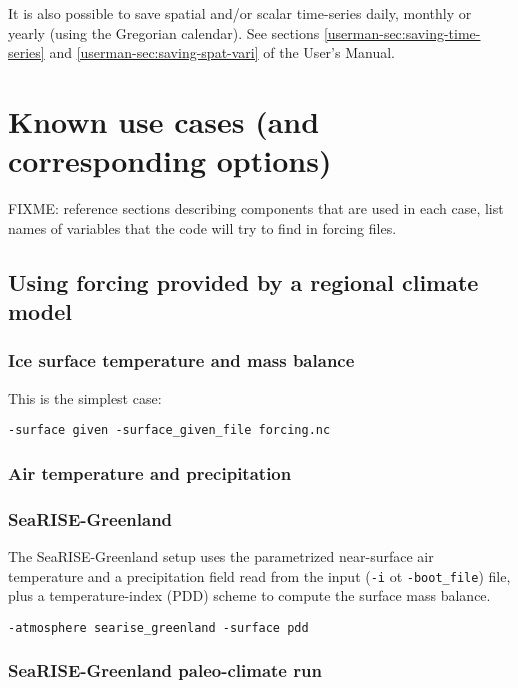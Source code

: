 \documentclass[titlepage,letterpaper,final]{scrartcl}
\begin{document}
It is also possible to save spatial and/or scalar time-series daily, monthly or
yearly (using the Gregorian calendar). See sections \ref*{userman-sec:saving-time-series}
and \ref*{userman-sec:saving-spat-vari} of the User's Manual.

\section{Known use cases (and corresponding options)}
\label{sec:known-use-cases}

FIXME: reference sections describing components that are used in each case,
list names of variables that the code will try to find in forcing files.

\subsection{Using forcing provided by a regional climate model}
\label{sec:regional-model}

\subsubsection{Ice surface temperature and mass balance}
\label{sec:ice-surface-bc}

This is the simplest case:
\begin{verbatim}
-surface given -surface_given_file forcing.nc
\end{verbatim}

\subsubsection{Air temperature and precipitation}
\label{sec:air-temp-and-precip}

\subsubsection{SeaRISE-Greenland}
\label{sec:parameterized-air-temp}

The SeaRISE-Greenland setup uses the parametrized near-surface air temperature
and a precipitation field read from the input (\texttt{-i} ot
\texttt{-boot_file}) file, plus a temperature-index (PDD) scheme to compute the
surface mass balance.

\begin{verbatim}
-atmosphere searise_greenland -surface pdd
\end{verbatim}

\subsubsection{SeaRISE-Greenland paleo-climate run}
\label{sec:searise-greenland-paleo}
\end{document}
